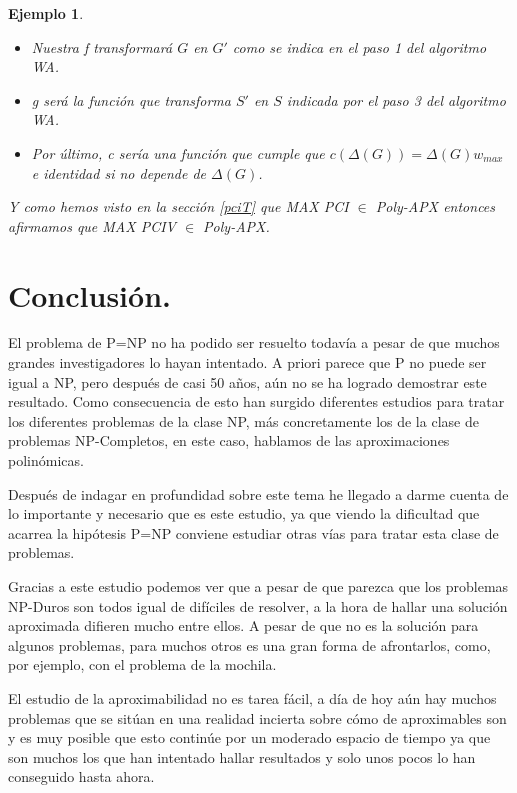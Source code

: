 \documentclass[a4paper,12pt,titlepage]{article}
\newtheorem{eje}{Ejemplo}[section]
\begin{document}
\begin{eje}
\begin{itemize}
\item Nuestra f transformar\'a $G$ en $G'$ como se indica en el paso 1 del algoritmo WA.
\item g ser\'a la funci\'on que transforma $S'$ en $S$ indicada por el paso 3 del algoritmo WA.
\item Por \'ultimo, c ser\'ia una funci\'on que cumple que $c(\Delta(G))=\Delta(G)w_{max}$ e identidad si no depende de $\Delta(G)$.
\end{itemize}

Y como hemos visto en la secci\'on \ref{pciT} que MAX PCI $\in$ Poly-APX entonces afirmamos que MAX PCIV $\in$ Poly-APX.

\end{eje}

\newpage

\section{Conclusi\'on.}

El problema de P=NP no ha podido ser resuelto todavía a pesar de que muchos grandes investigadores lo hayan intentado. A priori parece que P no puede ser igual a NP, pero despu\'es de casi 50 años, a\'un no se ha logrado demostrar este resultado. Como consecuencia de esto han surgido diferentes estudios para tratar los diferentes problemas de la clase NP, m\'as concretamente los de la clase de problemas NP-Completos, en este caso, hablamos de las aproximaciones polin\'omicas.

Despu\'es de indagar en profundidad sobre este tema he llegado a darme cuenta de lo importante y necesario que es este estudio, ya que viendo la dificultad que acarrea la hip\'otesis P=NP conviene estudiar otras v\'ias para tratar esta clase de problemas.

Gracias a este estudio podemos ver que a pesar de que parezca que los problemas NP-Duros son todos igual de dif\'iciles de resolver, a la hora de hallar una soluci\'on aproximada difieren mucho entre ellos. A pesar de que no es la soluci\'on para algunos problemas, para muchos otros es una gran forma de afrontarlos, como, por ejemplo, con el problema de la mochila.

El estudio de la aproximabilidad no es tarea f\'acil, a d\'ia de hoy a\'un hay muchos problemas que se sit\'uan en una realidad incierta sobre c\'omo de aproximables son y es muy posible que esto contin\'ue por un moderado espacio de tiempo ya que son muchos los que han intentado hallar resultados y solo unos pocos lo han conseguido hasta ahora.
\end{document}
